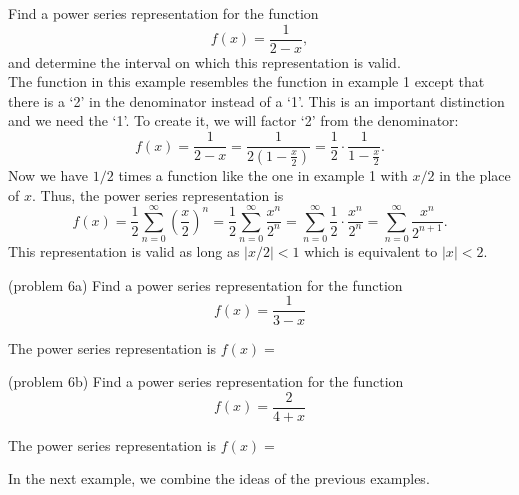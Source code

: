 \documentclass[handout]{ximera}
\begin{document}
\begin{example}[example 6]
Find a power series representation for the function
\[
f(x) = \frac{1}{2-x},
\]
and determine the interval on which this representation is valid.\\
The function in this example resembles the function in example 1 except that there is a `2' in the denominator instead of a `1'.
This is an important distinction and we need the `1'. To create it, we will factor `2' from the denominator:
\[
f(x) = \frac{1}{2 -x} = \frac{1}{2(1 - \frac{x}{2})} = \frac12 \cdot \frac{1}{1 - \frac{x}{2}}.
\]
Now we have $1/2$ times a function like the one in example 1 with $x/2$ in the place of $x$.
Thus, the power series representation is
\[
f(x) = \frac12 \sum_{n=0}^\infty \left(\frac{x}{2}\right)^n  = \frac12 \sum_{n=0}^\infty \frac{x^n}{2^n}
=  \sum_{n=0}^\infty \frac12 \cdot \frac{x^n}{2^n} =  \sum_{n=0}^\infty \frac{x^n}{2^{n+1}}.
\]
This representation is valid as long as $|x/2| < 1$ which is equivalent to $|x| < 2$.

\end{example}


\begin{problem}(problem 6a)
Find a power series representation for the function
\[
f(x) = \frac{1}{3-x}
\]

The power series representation is $f(x) = $
\begin{multipleChoice}
\end{multipleChoice}
\end{problem}



\begin{problem}(problem 6b)
Find a power series representation for the function
\[
f(x) = \frac{2}{4+x}
\]

The power series representation is $f(x) = $
\begin{multipleChoice}
\end{multipleChoice}
\end{problem}

In the next example, we combine the ideas of the previous examples.
\end{document}
